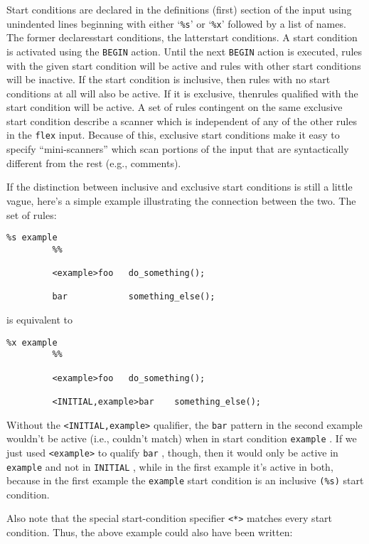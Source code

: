 \documentclass[openany,oneside]{book}
\begin{document}
Start conditions are declared in the definitions (first) section of the
input using unindented lines beginning with either ‘\verb`%s`’ or
‘\verb`%x`’ followed by a list of names.  The former declaresstart conditions, the latterstart
conditions.  A start condition is activated using the \verb`BEGIN` action.  Until the next \verb`BEGIN` action is executed, rules with the
given start condition will be active and rules with other start
conditions will be inactive.  If the start condition is inclusive, then
rules with no start conditions at all will also be active.  If it is
exclusive, thenrules qualified with the start condition
will be active.  A set of rules contingent on the same exclusive start
condition describe a scanner which is independent of any of the other
rules in the \verb`flex` input.  Because of this, exclusive start
conditions make it easy to specify “mini-scanners” which scan portions
of the input that are syntactically different from the rest (e.g.,
comments).

If the distinction between inclusive and exclusive start conditions
is still a little vague, here's a simple example illustrating the
connection between the two.  The set of rules:


\begin{verbatim}
%s example
         %%
     
         <example>foo   do_something();
     
         bar            something_else();
\end{verbatim}


is equivalent to


\begin{verbatim}
%x example
         %%
     
         <example>foo   do_something();
     
         <INITIAL,example>bar    something_else();
\end{verbatim}


Without the \verb`<INITIAL,example>` qualifier, the \verb`bar` pattern in
the second example wouldn't be active (i.e., couldn't match) when in
start condition \verb`example` .  If we just used \verb`<example>` to
qualify \verb`bar` , though, then it would only be active in \verb`example` and not in \verb`INITIAL` , while in the first example
it's active in both, because in the first example the \verb`example` start condition is an inclusive \verb`(%s)` start condition.

Also note that the special start-condition specifier \verb`<*>` matches every start condition.  Thus, the above example could also
have been written:
\end{document}
